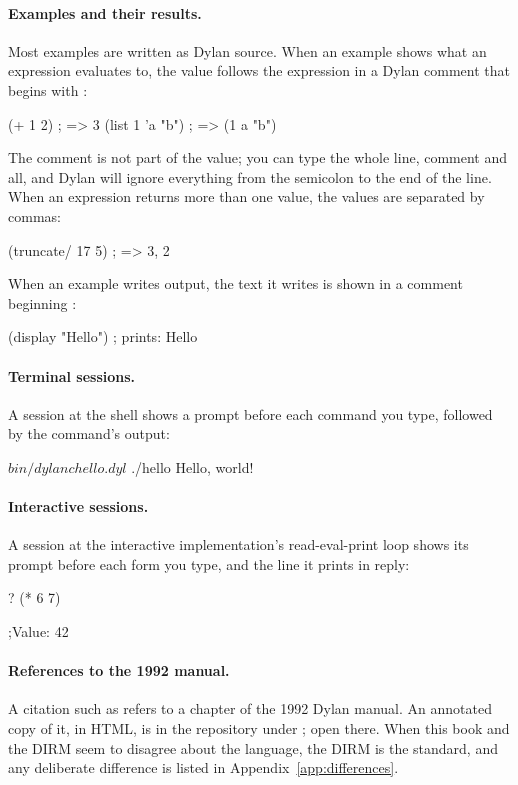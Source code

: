 \paragraph{Examples and their results.} Most examples are written as
Dylan source. When an example shows what an expression evaluates to, the
value follows the expression in a Dylan comment that begins with
\code{; =>}:

\begin{dylan}
(+ 1 2)          ; => 3
(list 1 'a "b")  ; => (1 a "b")
\end{dylan}

The comment is not part of the value; you can type the whole line,
comment and all, and Dylan will ignore everything from the semicolon to
the end of the line. When an expression returns more than one value, the
values are separated by commas:

\begin{dylan}
(truncate/ 17 5)  ; => 3, 2
\end{dylan}

When an example writes output, the text it writes is shown in a comment
beginning :

\begin{dylan}
(display "Hello")  ; prints: Hello
\end{dylan}

\paragraph{Terminal sessions.} A session at the shell shows a \code{\$}
prompt before each command you type, followed by the command's output:

\begin{shell}
$ bin/dylanc hello.dyl
$ ./hello
Hello, world!
\end{shell}

\paragraph{Interactive sessions.} A session at the interactive
implementation's read-eval-print loop shows its  prompt before each
form you type, and the  line it prints in reply:

\begin{repl}
? (* 6 7)

;Value: 42
\end{repl}

\paragraph{References to the 1992 manual.} A citation such as
 refers to a chapter of the 1992 Dylan manual. An
annotated copy of it, in HTML, is in the repository under
; open  there. When this
book and the DIRM seem to disagree about the language, the DIRM is the
standard, and any deliberate difference is listed in
Appendix~\ref{app:differences}.

